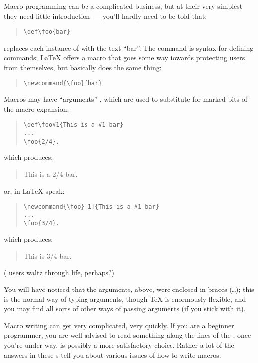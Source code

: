 Macro programming can be a complicated business, but at their very
simplest they need little introduction~--- you'll hardly need to be
told that:
\begin{quote}
\begin{verbatim}
\def\foo{bar}
\end{verbatim}
\end{quote}
replaces each instance of  with the text ``bar''.  The
command  is \plaintex{} syntax for defining commands;
\LaTeX{} offers a macro  that goes some way towards
protecting users from themselves, but basically does the same thing:
\begin{quote}
\begin{verbatim}
\newcommand{\foo}{bar}
\end{verbatim}
\end{quote}
Macros may have ``arguments'' , which are used to substitute for marked
bits of the macro expansion:
\begin{quote}
\begin{verbatim}
\def\foo#1{This is a #1 bar}
...
\foo{2/4}.
\end{verbatim}
\end{quote}
which produces:
\begin{quote}
  This is a 2/4 bar.
\end{quote}
or, in \LaTeX{} speak:
\begin{quote}
\begin{verbatim}
\newcommand{\foo}[1]{This is a #1 bar}
...
\foo{3/4}.
\end{verbatim}
\end{quote}
which produces:
\begin{quote}
  This is 3/4 bar.
\end{quote}
(\latex{} users waltz through life, perhaps?)

You will have noticed that the arguments, above, were enclosed in
braces (\texttt{\obracesymbol{}\dots{}\cbracesymbol{}}); this is the
normal way of typing arguments, though \TeX{} is enormously flexible,
and you may find all sorts of other ways of passing arguments (if you
stick with it).

Macro writing can get very complicated, very quickly.  If you are a
beginner \AllTeX{} programmer, you are well advised to read something
along the lines of the ; once you're under
way,  is possibly a more satisfactory
choice.  Rather a lot of the answers in these s tell you
about various issues of how to write macros.

